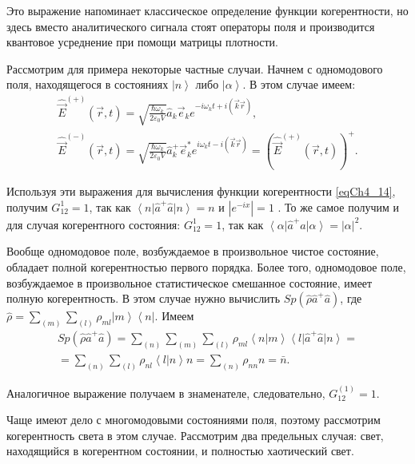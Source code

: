 Это выражение напоминает классическое определение функции
когерентности, но здесь вместо аналитического сигнала стоят операторы
поля и производится квантовое усреднение при помощи матрицы
плотности. 

Рассмотрим для примера некоторые частные случаи. Начнем с одномодового
поля, находящегося в состояниях  $\left|n\right>$  либо  $\left|\alpha\right>$.  В этом случае имеем: 
\begin{eqnarray}
\hat{\vec{E}}^{(+)}\left(\vec{r}, t\right) = \sqrt{\frac{\hbar \omega_k}{2 \varepsilon_0
    V}} \hat{a}_k \vec{e}_k e^{-i \omega_k t + i \left(\vec{k}\vec{r}
  \right)},
\nonumber \\
\hat{\vec{E}}^{(-)}\left(\vec{r}, t\right) = \sqrt{\frac{\hbar \omega_k}{2 \varepsilon_0
V}} \hat{a}_k^{+} \vec{e}_k^{*} e^{i \omega_k t - i \left(\vec{k}\vec{r}
  \right)} = \left(\hat{\vec{E}}^{(+)}\left(\vec{r}, t\right)\right)^{+}.
\label{eqCh4_15}
\end{eqnarray}

Используя эти выражения для вычисления функции когерентности
\eqref{eqCh4_14}, получим $G_{12}^{1} = 1$,  так как
$\left<n\right|\hat{a}^{+}\hat{a}\left|n\right> = n$   и
$\left|e^{-i x}\right| = 1$ . То же самое получим и для случая
когерентного состояния:  $G_{12}^{1} = 1$,  так как
$\left<\alpha\right|\hat{a}^{+}\hat{a}\left|\alpha\right> =
\left|\alpha\right|^2$. 

Вообще одномодовое поле, возбуждаемое в произвольное чистое состояние,
обладает полной когерентностью первого порядка. Более того,
одномодовое поле, возбуждаемое в произвольное статистическое смешанное
состояние, имеет полную когерентность. В этом случае нужно вычислить
$Sp \left(\hat{\rho} \hat{a}^{+}\hat{a}\right)$,  где  $\hat{\rho} =
\sum_{(m)}\sum_{(l)}\rho_{ml}\left|m\right>\left<n\right|$.  Имеем  
\begin{eqnarray}
Sp \left(\hat{\rho} \hat{a}^{+}\hat{a}\right) = 
\sum_{(n)}\sum_{(m)}\sum_{(l)}\rho_{ml}\left<n\right.\left|m\right>\left<l\right|
\hat{a}^{+}\hat{a}\left|n\right> = 
\nonumber \\
= \sum_{(n)}\sum_{(l)}\rho_{nl}\left<l\right.\left|n\right>n = 
\sum_{(n)}\rho_{nn}n = \bar{n}.
\label{eqCh4_16}
\end{eqnarray}

Аналогичное выражение получаем в знаменателе, следовательно,
$G_{12}^{(1)} = 1$.

Чаще имеют дело с многомодовыми состояниями поля, поэтому рассмотрим
когерентность света в этом случае. Рассмотрим два предельных случая:
свет, находящийся в когерентном состоянии, и полностью хаотический
свет. 

